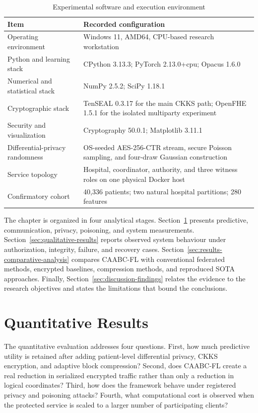 \begin{table}[htbp]
    \centering
    \caption{Experimental software and execution environment}
    \label{tab:results-environment}
    \begin{tabularx}{\textwidth}{@{}lX@{}}
        \toprule
        Item & Recorded configuration \\
        \midrule
        Operating environment & Windows 11, AMD64, CPU-based research workstation \\
        Python and learning stack & CPython 3.13.3; PyTorch 2.13.0+cpu; Opacus 1.6.0 \\
        Numerical and statistical stack & NumPy 2.5.2; SciPy 1.18.1 \\
        Cryptographic stack & TenSEAL 0.3.17 for the main CKKS path; OpenFHE 1.5.1 for the isolated multiparty experiment \\
        Security and visualization & Cryptography 50.0.1; Matplotlib 3.11.1 \\
        Differential-privacy randomness & OS-seeded AES-256-CTR stream, secure Poisson sampling, and four-draw Gaussian construction \\
        Service topology & Hospital, coordinator, authority, and three witness roles on one physical Docker host \\
        Confirmatory cohort & 40,336 patients; two natural hospital partitions; 280 features \\
        \bottomrule
    \end{tabularx}
\end{table}

The chapter is organized in four analytical stages. Section~\ref{sec:quantitative-results} presents predictive, communication, privacy, poisoning, and system measurements. Section~\ref{sec:qualitative-results} reports observed system behaviour under authorization, integrity, failure, and recovery cases. Section~\ref{sec:results-comparative-analysis} compares CAABC-FL with conventional federated methods, encrypted baselines, compression methods, and reproduced SOTA approaches. Finally, Section~\ref{sec:discussion-findings} relates the evidence to the research objectives and states the limitations that bound the conclusions.

\section{Quantitative Results}
\label{sec:quantitative-results}

The quantitative evaluation addresses four questions. First, how much predictive utility is retained after adding patient-level differential privacy, CKKS encryption, and adaptive block compression? Second, does CAABC-FL create a real reduction in serialized encrypted traffic rather than only a reduction in logical coordinates? Third, how does the framework behave under registered privacy and poisoning attacks? Fourth, what computational cost is observed when the protected service is scaled to a larger number of participating clients?

